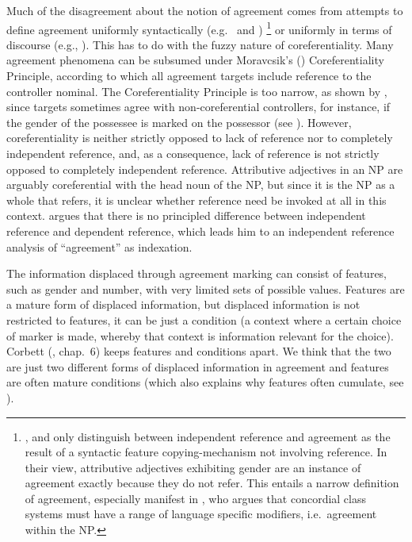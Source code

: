 \documentclass[output=collectionpaper]{langsci/langscibook}
\begin{document}
Much of the disagreement about the notion of agreement comes from attempts to define agreement uniformly syntactically (e.g.\ \citealt{Hengeveld2012} and \citealt{Passer2016b})%
\footnote{%
\cite{Hengeveld2012}, \cite{Rijn2016} and \cite{Passer2016b} only distinguish between independent reference and agreement as the result of a syntactic feature copying-mechanism not involving reference. In their view, attributive adjectives exhibiting gender are an instance of agreement exactly because they do not refer. This entails a narrow definition of agreement, especially manifest in \cite[86]{Passer2016b}, who argues that concordial class systems must have a range of language specific modifiers, i.e.\ agreement within the NP.
} %
or uniformly in terms of discourse (e.g., \citealt{Barlow1999}). This has to do with the fuzzy nature of coreferentiality. Many agreement phenomena can be subsumed under Moravcsik's (\citealt*[363]{Moravcsik1978}) Coreferentiality Principle, according to which all agreement targets include reference to the controller nominal. The Coreferentiality Principle is too narrow, as shown by \cite{Corbett2006}, since targets sometimes agree with non-coreferential controllers, for instance, if the gender of the possessee is marked on the possessor (see ). However, coreferentiality is neither strictly opposed to lack of reference nor to completely independent reference, and, as a consequence, lack of reference is not strictly opposed to completely independent reference. Attributive adjectives in an NP are arguably coreferential with the head noun of the NP, but since it is the NP as a whole that refers, it is unclear whether reference need be invoked at all in this context. \cite{Croft2013} argues that there is no principled difference between independent reference and dependent reference, which leads him to an independent reference analysis of ``agreement'' as indexation.

The information displaced through agreement marking can consist of features, such as gender and number, with very limited sets of possible values. Features are a mature form of displaced information, but displaced information is not restricted to features, it can be just a condition (a context where a certain choice of marker is made, whereby that context is information relevant for the choice). Corbett (\citealt*{Corbett2006}, chap.~6) keeps features and conditions apart. We think that the two are just two different forms of displaced information in agreement and features are often mature conditions (which also explains why features often cumulate, see ).
\end{document}
